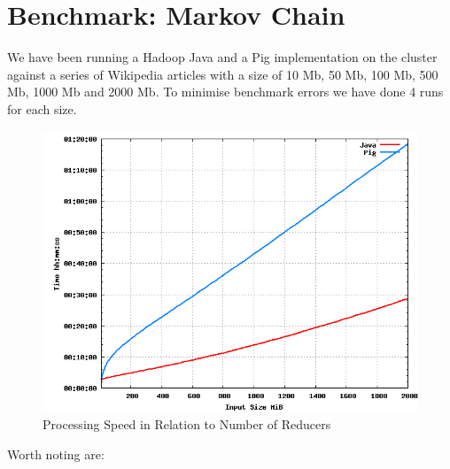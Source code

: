 \section{Benchmark: Markov Chain}

We have been running a Hadoop Java and a Pig implementation on the cluster against a series of Wikipedia articles with a size of 10 Mb, 50 Mb, 100 Mb, 500 Mb, 1000 Mb and 2000 Mb. To minimise benchmark errors we have done 4 runs for each size.

\begin{figure}[H]
  \begin{center}
    \includegraphics[width=\textwidth]{../benchmarks/markov}
  \end{center}
  \caption{Processing Speed in Relation to Number of Reducers}
  \label{fig:reducers}
\end{figure}


Worth noting are:        